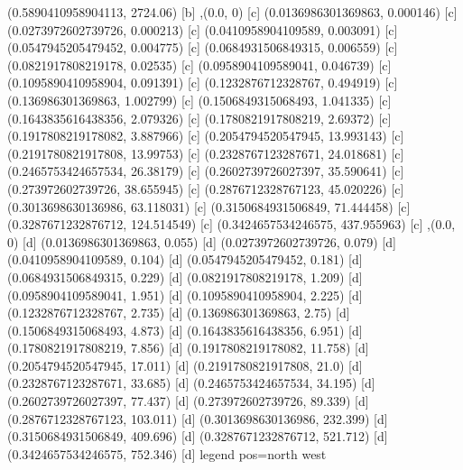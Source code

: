 {{{(0.5890410958904113, 2724.06) [b] 
},{(0.0, 0) [c] 
(0.0136986301369863, 0.000146) [c] 
(0.0273972602739726, 0.000213) [c] 
(0.0410958904109589, 0.003091) [c] 
(0.0547945205479452, 0.004775) [c] 
(0.0684931506849315, 0.006559) [c] 
(0.0821917808219178, 0.02535) [c] 
(0.0958904109589041, 0.046739) [c] 
(0.1095890410958904, 0.091391) [c] 
(0.1232876712328767, 0.494919) [c] 
(0.136986301369863, 1.002799) [c] 
(0.1506849315068493, 1.041335) [c] 
(0.1643835616438356, 2.079326) [c] 
(0.1780821917808219, 2.69372) [c] 
(0.1917808219178082, 3.887966) [c] 
(0.2054794520547945, 13.993143) [c] 
(0.2191780821917808, 13.99753) [c] 
(0.2328767123287671, 24.018681) [c] 
(0.2465753424657534, 26.38179) [c] 
(0.2602739726027397, 35.590641) [c] 
(0.273972602739726, 38.655945) [c] 
(0.2876712328767123, 45.020226) [c] 
(0.3013698630136986, 63.118031) [c] 
(0.3150684931506849, 71.444458) [c] 
(0.3287671232876712, 124.514549) [c] 
(0.3424657534246575, 437.955963) [c] 
},{(0.0, 0) [d] 
(0.0136986301369863, 0.055) [d] 
(0.0273972602739726, 0.079) [d] 
(0.0410958904109589, 0.104) [d] 
(0.0547945205479452, 0.181) [d] 
(0.0684931506849315, 0.229) [d] 
(0.0821917808219178, 1.209) [d] 
(0.0958904109589041, 1.951) [d] 
(0.1095890410958904, 2.225) [d] 
(0.1232876712328767, 2.735) [d] 
(0.136986301369863, 2.75) [d] 
(0.1506849315068493, 4.873) [d] 
(0.1643835616438356, 6.951) [d] 
(0.1780821917808219, 7.856) [d] 
(0.1917808219178082, 11.758) [d] 
(0.2054794520547945, 17.011) [d] 
(0.2191780821917808, 21.0) [d] 
(0.2328767123287671, 33.685) [d] 
(0.2465753424657534, 34.195) [d] 
(0.2602739726027397, 77.437) [d] 
(0.273972602739726, 89.339) [d] 
(0.2876712328767123, 103.011) [d] 
(0.3013698630136986, 232.399) [d] 
(0.3150684931506849, 409.696) [d] 
(0.3287671232876712, 521.712) [d] 
(0.3424657534246575, 752.346) [d] 
}}}{legend pos=north west}
